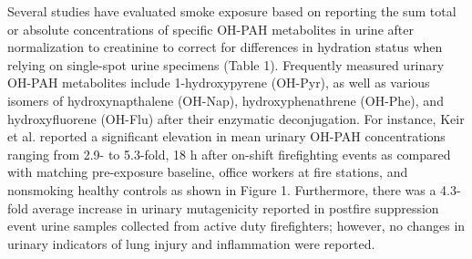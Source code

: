\documentclass[preprint, 3p,
authoryear]{elsarticle} %
\begin{document}
Several studies have evaluated smoke exposure based on reporting the sum
total or absolute concentrations of specific OH-PAH metabolites in urine
after normalization to creatinine to correct for differences in
hydration status when relying on single-spot urine specimens (Table 1).
Frequently measured urinary OH-PAH metabolites include 1-hydroxypyrene
(OH-Pyr), as well as various isomers of hydroxynapthalene (OH-Nap),
hydroxyphenathrene (OH-Phe), and hydroxyfluorene (OH-Flu) after their
enzymatic deconjugation. For instance, Keir et al. \citep{29} reported a
significant elevation in mean urinary OH-PAH concentrations ranging from
2.9- to 5.3-fold, 18 h after on-shift firefighting events as compared
with matching pre-exposure baseline, office workers at fire stations,
and nonsmoking healthy controls as shown in Figure 1. Furthermore, there
was a 4.3-fold average increase in urinary mutagenicity reported in
postfire suppression event urine samples collected from active duty
firefighters; however, no changes in urinary indicators of lung injury
and inflammation were reported.
\end{document}
